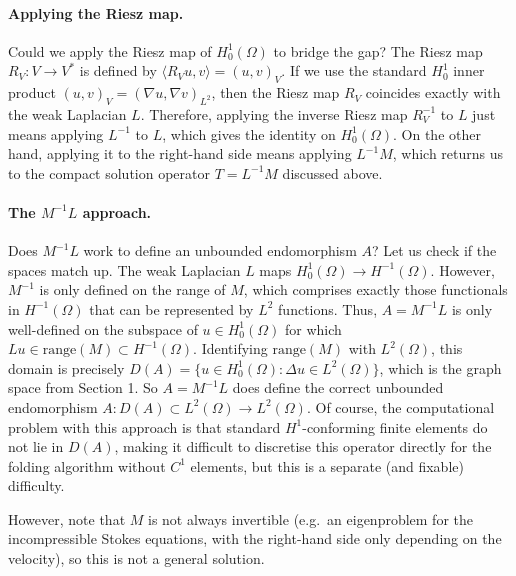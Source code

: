 \documentclass[11pt,a4paper]{article}
\begin{document}
\paragraph{Applying the Riesz map.}
Could we apply the Riesz map of $H^1_0(\Omega)$ to bridge the gap? The Riesz map $R_V \colon V \to V^*$ is defined by $\langle R_V u, v \rangle = (u, v)_V$. If we use the standard $H^1_0$ inner product $(u, v)_V = (\nabla u, \nabla v)_{L^2}$, then the Riesz map $R_V$ coincides exactly with the weak Laplacian $L$. 
Therefore, applying the inverse Riesz map $R_V^{-1}$ to $L$ just means applying $L^{-1}$ to $L$, which gives the identity on $H^1_0(\Omega)$. On the other hand, applying it to the right-hand side means applying $L^{-1} M$, which returns us to the compact solution operator $T = L^{-1} M$ discussed above.


\paragraph{The $M^{-1} L$ approach.}
Does $M^{-1} L$ work to define an unbounded endomorphism $A$? Let us check if the spaces match up. 
The weak Laplacian $L$ maps $H^1_0(\Omega) \to H^{-1}(\Omega)$. However, $M^{-1}$ is only defined on the range of $M$, which comprises exactly those functionals in $H^{-1}(\Omega)$ that can be represented by $L^2$ functions. 
Thus, $A = M^{-1} L$ is only well-defined on the subspace of $u \in H^1_0(\Omega)$ for which $L u \in \text{range}(M) \subset H^{-1}(\Omega)$. Identifying $\text{range}(M)$ with $L^2(\Omega)$, this domain is precisely $D(A) = \{ u \in H^1_0(\Omega) : \Delta u \in L^2(\Omega) \}$, which is the graph space from Section 1. 
So $A = M^{-1} L$ does define the correct unbounded endomorphism $A \colon D(A) \subset L^2(\Omega) \to L^2(\Omega)$. Of course, the computational problem with this approach is that standard $H^1$-conforming finite elements do not lie in $D(A)$, making it difficult to discretise this operator directly for the folding algorithm without $C^1$ elements, but this is a separate (and fixable) difficulty.

However, note that $M$ is not always invertible (e.g.~an eigenproblem for the incompressible Stokes equations, with the right-hand side only depending on the velocity), so this is not a general solution.
\end{document}
